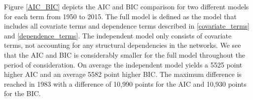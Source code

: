 \documentclass[headsepline=true, abstracton]{scrartcl}
\begin{document}
Figure \ref{AIC_BIC} depicts the AIC and BIC comparison for two different models for each term from 1950 to 2015. The full model is defined as the model that includes all covariate terms and dependence terms described in \ref{covariate_terms} and \ref{dependence_terms}. The independent model only consists of covariate terms, not accounting for any structural dependencies in the networks. We see that the AIC and BIC is considerably smaller for the full model throughout the period of consideration. On average the independent model yields a 5525 point higher AIC and an average 5582 point higher BIC. The maximum difference is reached in 1983 with a difference of 10,990 points for the AIC and 10,930 points for the BIC.



\end{document}
